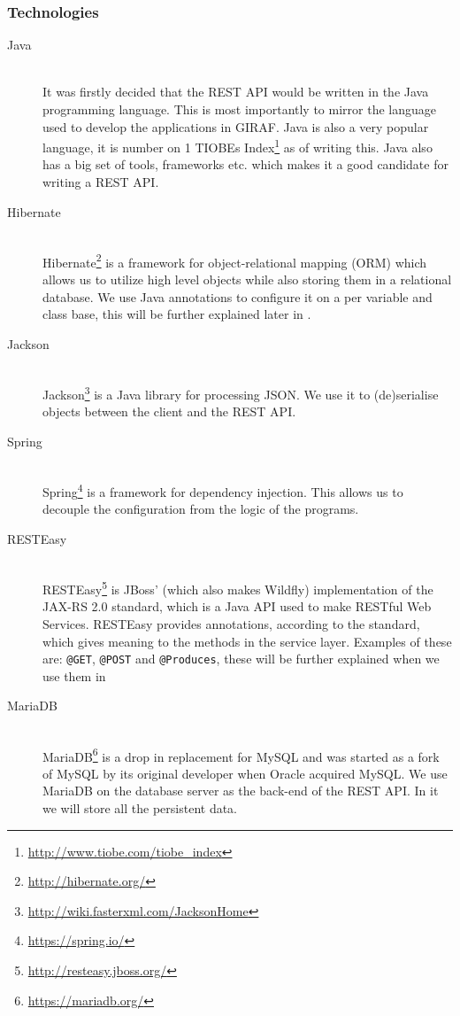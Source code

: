 \subsubsection{Technologies}
\begin{description}
    \item[Java] \hfill \\
        It was firstly decided that the REST API would be written in the Java programming language.
        This is most importantly to mirror the language used to develop the applications in GIRAF.
        Java is also a very popular language, it is number on 1 TIOBEs Index\footnote{\url{http://www.tiobe.com/tiobe_index}} as of writing this. 
        Java also has a big set of tools, frameworks etc. which makes it a good candidate for writing a REST API.

    \item[Hibernate] \hfill \\
        Hibernate\footnote{\url{http://hibernate.org/}} is a framework for object-relational mapping (ORM) which allows us to utilize high level objects while also storing them in a relational database. 
        We use Java annotations to configure it on a per variable and class base, this will be further explained later in .

    \item[Jackson] \hfill \\
        Jackson\footnote{\url{http://wiki.fasterxml.com/JacksonHome}} is a Java library for processing JSON.
        We use it to (de)serialise objects between the client and the REST API. 

    \item[Spring] \hfill \\ 
        Spring\footnote{\url{https://spring.io/}} is a framework for dependency injection. 
        This allows us to decouple the configuration from the logic of the programs. 

    \item[RESTEasy] \hfill \\
        RESTEasy\footnote{\url{http://resteasy.jboss.org/}} is JBoss' (which also makes Wildfly) implementation of the JAX-RS 2.0 standard, which is a Java API used to make RESTful Web Services.
        RESTEasy provides annotations, according to the standard, which gives meaning to the methods in the service layer.
        Examples of these are: \texttt{@GET}, \texttt{@POST} and \texttt{@Produces}, these will be further explained when we use them in 

    \item[MariaDB] \hfill \\ 
        MariaDB\footnote{\url{https://mariadb.org/}} is a drop in replacement for MySQL and was started as a fork of MySQL by its original developer when Oracle acquired MySQL.
        We use MariaDB on the database server as the back-end of the REST API.
        In it we will store all the persistent data. 
\end{description}
